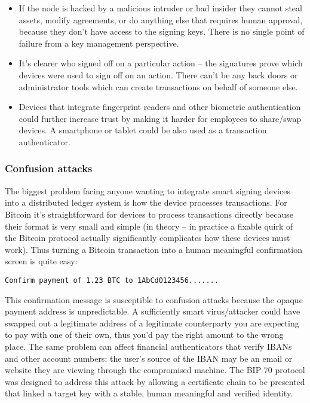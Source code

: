 \documentclass{article}
\begin{document}
\begin{itemize}
    \item If the node is hacked by a malicious intruder or bad insider they cannot steal assets, modify agreements,
    or do anything else that requires human approval, because they don't have access to the signing keys. There is no single
    point of failure from a key management perspective.
    \item It's clearer who signed off on a particular action -- the signatures prove which devices were used to sign off
    on an action. There can't be any back doors or administrator tools which can create transactions on behalf of someone else.
    \item Devices that integrate fingerprint readers and other biometric authentication could further increase trust by
    making it harder for employees to share/swap devices. A smartphone or tablet could be also used as a transaction authenticator.
\end{itemize}

\subsubsection{Confusion attacks}

The biggest problem facing anyone wanting to integrate smart signing devices into a distributed ledger system is
how the device processes transactions. For Bitcoin it's straightforward for devices to process transactions
directly because their format is very small and simple (in theory -- in practice a fixable quirk of the Bitcoin
protocol actually significantly complicates how these devices must work). Thus turning a Bitcoin transaction into a
human meaningful confirmation screen is quite easy:

\indent\texttt{Confirm payment of 1.23 BTC to 1AbCd0123456.......}

This confirmation message is susceptible to confusion attacks because the opaque payment address is unpredictable.
A sufficiently smart virus/attacker could have swapped out a legitimate address of a legitimate counterparty you
are expecting to pay with one of their own, thus you'd pay the right amount to the wrong place. The same problem
can affect financial authenticators that verify IBANs and other account numbers: the user's source of the IBAN may
be an email or website they are viewing through the compromised machine. The BIP 70\cite{BIP70} protocol was
designed to address this attack by allowing a certificate chain to be presented that linked a target key with a
stable, human meaningful and verified identity.
\end{document}
